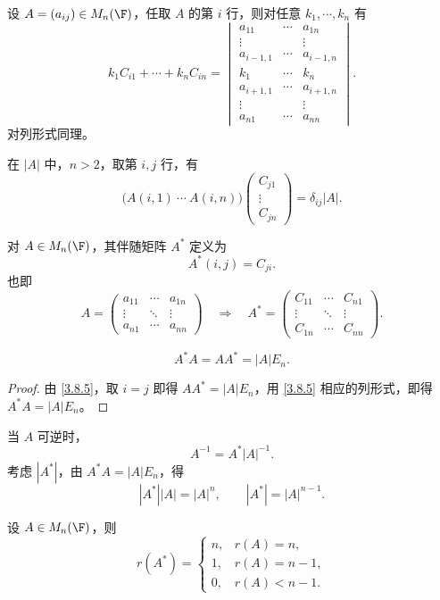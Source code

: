 \begin{corollary}\label{3.8.4}
	设 $A=(a_{ij})\in M_n(\F)$，任取 $A$ 的第 $i$ 行，则对任意 $k_1,\cdots,k_n$ 有
	\[
	k_1C_{i1}+\cdots+k_nC_{in}
	=
	\begin{vmatrix}
		a_{11}&\cdots&a_{1n}\\
		\vdots&&\vdots\\
		a_{i-1,1}&\cdots&a_{i-1,n}\\
		k_1&\cdots&k_n\\
		a_{i+1,1}&\cdots&a_{i+1,n}\\
		\vdots&&\vdots\\
		a_{n1}&\cdots&a_{nn}
	\end{vmatrix}.
	\]
	对列形式同理。
\end{corollary}

\begin{corollary}\label{3.8.5}
	在 $|A|$ 中，$n>2$，取第 $i,j$ 行，有
	\[
	\bigl(A(i,1)\ \cdots\ A(i,n)\bigr)
	\begin{pmatrix}
		C_{j1}\\
		\vdots\\
		C_{jn}
	\end{pmatrix}
	=\delta_{ij}|A|.
	\]
\end{corollary}

\begin{definition}\label{3.8.6}
	对 $A\in M_n(\F)$，其伴随矩阵 $A^*$ 定义为
	\[
	A^*(i,j)=C_{ji}.
	\]
	也即
	\[
	A=\begin{pmatrix}
		a_{11}&\cdots&a_{1n}\\
		\vdots&\ddots&\vdots\\
		a_{n1}&\cdots&a_{nn}
	\end{pmatrix}
	\quad\Longrightarrow\quad
	A^*=\begin{pmatrix}
		C_{11}&\cdots&C_{n1}\\
		\vdots&\ddots&\vdots\\
		C_{1n}&\cdots&C_{nn}
	\end{pmatrix}.
	\]
\end{definition}

\begin{theorem}\label{3.8.7}
	\[
	A^*A=AA^*=|A|E_n.
	\]
\end{theorem}

\begin{proof}
	由 \ref{3.8.5}，取 $i=j$ 即得 $AA^*=|A|E_n$，用 \ref{3.8.5} 相应的列形式，即得 $A^*A=|A|E_n$。
	
	
\end{proof}
当 $A$ 可逆时，
\[
A^{-1}=A^*|A|^{-1}.
\]
考虑 $|A^*|$，由 $A^*A=|A|E_n$，得
\[
|A^*||A|=|A|^n,
\qquad |A^*|=|A|^{n-1}.
\]
\begin{proposition}\label{3.8.8}
	设 $A\in M_n(\F)$，则
	\[
	r(A^*)=
	\begin{cases}
		n, & r(A)=n,\\
		1, & r(A)=n-1,\\
		0, & r(A)<n-1.
	\end{cases}
	\]
\end{proposition}

